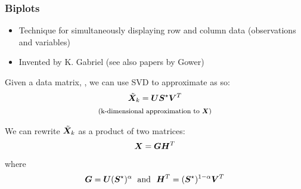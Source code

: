 \documentclass{beamer}
\begin{document}






\begin{frame}
  \frametitle{Biplots}

\begin{itemize}
  \item Technique for simultaneously displaying row and column data (observations and variables)
  \item Invented by K. Gabriel (see also papers by Gower)
\end{itemize}

Given a data matrix, , we can use SVD to approximate  as so:
\begin{gather*}
  \tilde{\bm{X}}_k =  \bm{U}\bm{S}^{\star} \bm{V}^T \\
  \text{\footnotesize (k-dimensional approximation to \ensuremath{\bm{X}})}
\end{gather*}


We can rewrite $\tilde{\bm{X}}_k$ as a product of two matrices:
\[
  \bm{X} = \bm{G}\bm{H}^T
\]
where
\[
  \bm{G} = \bm{U}(\bm{S}^{\star})^\alpha\; \text{ and } \ \bm{H}^T = (\bm{S}^{\star})^{1-\alpha}\bm{V}^T
\]
\end{frame}

\end{document}
